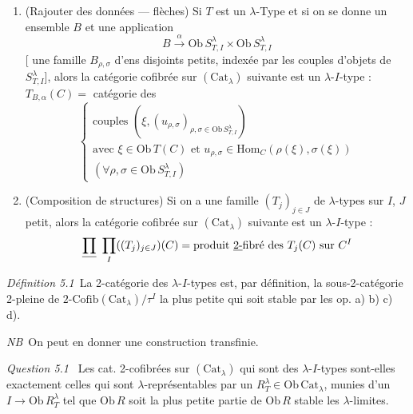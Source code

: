 \documentclass[11pt,a4paper]{article}
\begin{document}
\begin{enumerate}
  \item[c)] (Rajouter des données — flèches) Si $T$ est un
    $\lambda$-Type  et si on se donne \struck{\ill{}} \ill{} un
      ensemble $B$ et
    une application
    \[
      B \xrightarrow{\ \alpha\ } \mathrm{Ob}\,S^{\lambda}_{T,I} \times
      \mathrm{Ob}\,S^{\lambda}_{T,I}
    \]
    \struck{\ill{}} [ une famille $B_{\rho,\sigma}$
    d'ens disjoints  petits, indexée par les couples d'objets de
    $S^{\lambda}_{T,I}$], alors la catégorie cofibrée sur
    $(\mathrm{Cat}_{\lambda})$ suivante est un $\lambda$-$I$-type :
    $T_{B,\alpha}(C) = $  catégorie des
    \[
      \begin{cases}
        \text{couples } (\xi, (u_{\rho,\sigma})_{\rho,\sigma \in
        \mathrm{Ob}\,S^{\lambda}_{T,I}}) \\
        \text{avec } \xi \in \mathrm{Ob}\,T(C) \text{ et }
        u_{\rho,\sigma} \in \mathrm{Hom}_{C}(\rho(\xi), \sigma(\xi)) \\
        (\forall \rho, \sigma \in \mathrm{Ob}\,S^{\lambda}_{T,I})
      \end{cases}
    \]
  \item[d)] \struck{\ill{}} (Composition de structures) Si on a une
    famille $(T_{j})_{j \in J}$ de $\lambda$-types sur $I$, $J$ petit,
    \struck{\ill{}} alors la catégorie cofibrée sur
    $(\mathrm{Cat}_{\lambda})$ suivante est un $\lambda$-$I$-type :
    \[
      \struck{\prod}\ \prod_{I}((T_{j})_{j \in J})(C) =
      \text{produit } \uncertain{\text{2-}}\text{fibré des } T_{j}(C)
      \text{ sur } C^{I}
    \]
\end{enumerate}

\emph{Définition 5.1}\ La 2-catégorie des $\lambda$-$I$-types est,
par définition, la sous-2-catégorie 2-pleine de 
$\text{2-Cofib}(\mathrm{Cat}_{\lambda})/\tau^{I}$  la
plus petite qui soit stable par les op. a) b) c) d).

\emph{NB}\ On peut en donner une construction transfinie.

\emph{Question 5.1}\  Les
cat. 2-cofibrées sur $(\mathrm{Cat}_{\lambda})$ qui sont des
$\lambda$-$I$-types sont-elles exactement celles qui sont
$\lambda$-représentables par un $R^{\lambda}_{T} \in
\mathrm{Ob}\,\mathrm{Cat}_{\lambda}$, munies d'un $I \to
\mathrm{Ob}\,R^{\lambda}_{T}$ tel que 
$\mathrm{Ob}\,R$ soit la plus petite partie de $\mathrm{Ob}\,R$
stable \ill{} les $\lambda$-limites.
\end{document}
